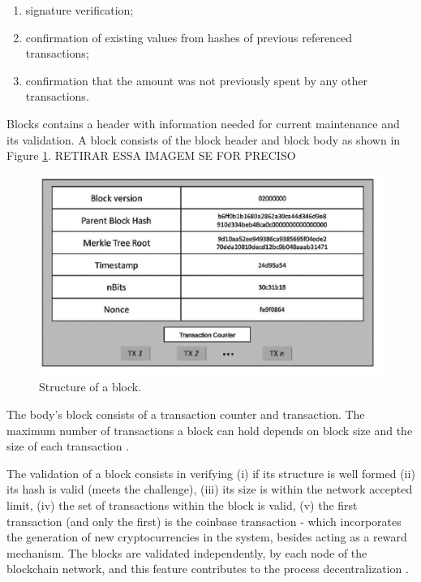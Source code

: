 \begin{enumerate}
	\item signature verification;
	\item confirmation of existing values from hashes of previous referenced transactions;
	\item confirmation that the amount was not previously spent by any other transactions.
\end{enumerate}

\label{sec:blocks}
Blocks contains a header with information needed for current maintenance and its validation. A block consists of the block header and block body as shown in Figure \ref{fig:block}. 
{\color{red} RETIRAR ESSA IMAGEM SE FOR PRECISO}
\begin{figure}[htbp]
\begin{center}
  \includegraphics[scale=0.5]{images/blockStructure.png}
\caption{Structure of a block. \cite{zheng2016blockchain}}
\label{fig:block}
\end{center}
\end{figure}

The body's block consists of a transaction counter and transaction. The maximum number of transactions a block can hold depends on block size and the size of each transaction \cite{zheng2016blockchain}.

The validation of a block consists in verifying (i) if its structure is well formed (ii) its hash is valid (meets the challenge), (iii) its size is within the network accepted limit, (iv) the set of transactions within the block is valid, (v) the first transaction (and only the first) is the coinbase transaction - which incorporates the generation of new cryptocurrencies in the system, besides acting as a reward mechanism. The blocks are validated independently, by each node of the blockchain network, and this feature contributes to the process decentralization \cite{greve2018blockchain}.

